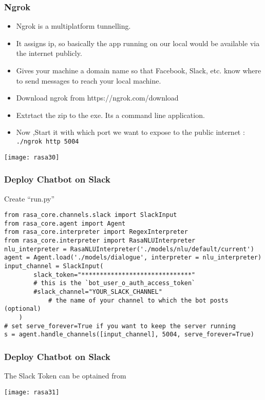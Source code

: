 \begin{frame}[fragile]\frametitle{Ngrok}
\begin{itemize}
\item Ngrok is a multiplatform tunnelling. 
\item It assigns ip, so basically the app running on our local would be available via the internet publicly.
\item Gives your machine a domain name so that Facebook, Slack, etc. know where to send messages to reach your local machine.
\item Download ngrok from https://ngrok.com/download 	
\item Extrtact the zip to the exe. Its a command line application.
\item Now ,Start it with which port we want to expose to the public internet : \lstinline| ./ngrok http 5004|
\end{itemize}

\begin{center}
\texttt{[image: rasa30]}
\end{center}
\end{frame}

\begin{frame}[fragile]\frametitle{Deploy Chatbot on Slack}
Create ``run.py''
\begin{lstlisting}
from rasa_core.channels.slack import SlackInput
from rasa_core.agent import Agent
from rasa_core.interpreter import RegexInterpreter
from rasa_core.interpreter import RasaNLUInterpreter
nlu_interpreter = RasaNLUInterpreter('./models/nlu/default/current')
agent = Agent.load('./models/dialogue', interpreter = nlu_interpreter)
input_channel = SlackInput(
        slack_token="******************************"
        # this is the `bot_user_o_auth_access_token`
        #slack_channel="YOUR_SLACK_CHANNEL"
            # the name of your channel to which the bot posts (optional)
    )
# set serve_forever=True if you want to keep the server running
s = agent.handle_channels([input_channel], 5004, serve_forever=True)
\end{lstlisting}

\end{frame}

\begin{frame}[fragile]\frametitle{Deploy Chatbot on Slack}
The Slack Token can be optained from


\begin{center}
\texttt{[image: rasa31]}
\end{center}
\end{frame}


